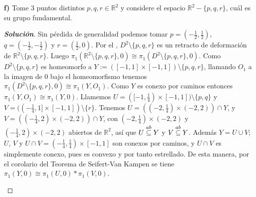 \textbf{f)} Tome 3 puntos distintos $p,q,r\in\mathbb{R}^2$ y considere el espacio $\mathbb{R}^2-\{p,q,r\}$, cuál es su grupo fundamental.
\begin{proof}[\textbf{Solución}]
Sin pérdida de generalidad podemos tomar $p=(-\tfrac12,\tfrac12)$, $q=(-\tfrac12,-\tfrac12)$ y $r=(\tfrac12,0)$. Por el , $D^2\setminus\{p,q,r\}$ es un retracto de deformación de $\mathbb{R}^2\setminus\{p,q,r\}$. Luego $\pi_1(\mathbb{R}^2\setminus\{p,q,r\},0)\cong\pi_1(D^2\setminus\{p,q,r\},0)$. Como $D^2\setminus\{p,q,r\}$ es homeomorfo a $Y:=([-1,1]\times[-1,1])\setminus\{p,q,r\}$, llamando $O_1$ a la imagen de $0$ bajo el homeomorfismo tenemos $\pi_1(D^2\setminus\{p,q,r\},0)\cong\pi_1(Y,O_1)$. Como $Y$ es conexo por caminos entonces $\pi_1(Y,O_1)\cong\pi_1(Y,0)$. Llamemos $U=([-1,\tfrac14)\times[-1,1])\setminus\{p,q\}$ y $V=((-\tfrac14,1]\times[-1,1])\setminus\{r\}$. Tenemos $U=((-2,\tfrac14)\times(-2,2))\cap Y$, y $V=((-\tfrac14,2)\times(-2,2))\cap Y$, con $(-2,\tfrac14)\times(-2,2)$ y $(-\tfrac14,2)\times(-2,2)$ abiertos de $\mathbb{R}^2$, así que $U\stackrel{ab}{\subseteq} Y$ y $V\stackrel{ab}{\subseteq} Y$. Además $Y=U\cup V$; $U$, $V$ y $U\cap V=(-\tfrac14,\tfrac14)\times[-1,1]$ son conexos por caminos, y $U\cap V$ es simplemente conexo, pues es convexo y por tanto estrellado. De esta manera, por el corolario del Teorema de Seifert-Van Kampen se tiene $\pi_1(Y,0)\cong\pi_1(U,0)*\pi_1(V,0)$.
\begin{center}
\end{center}
\end{proof}
